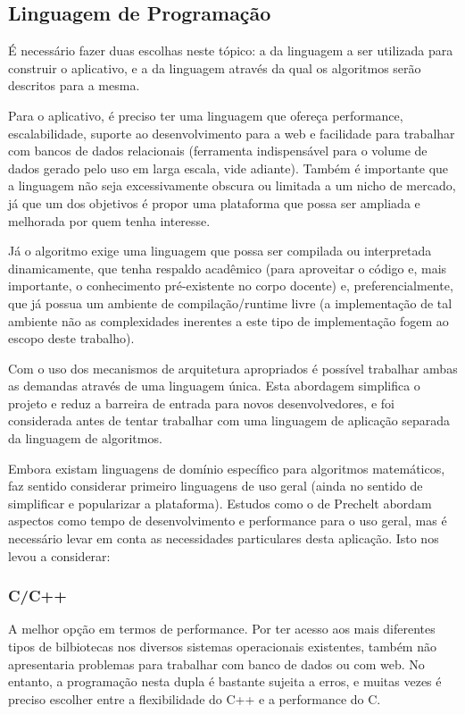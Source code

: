 \documentclass{abnt}
\begin{document}
\subsection{Linguagem de Programação}
É necessário fazer duas escolhas neste tópico: a da linguagem a ser utilizada para construir o aplicativo, e a da linguagem através da qual os algoritmos serão descritos para a mesma.

Para o aplicativo, é preciso ter uma linguagem que ofereça performance, escalabilidade, suporte ao desenvolvimento para a web e facilidade para trabalhar com bancos de dados relacionais (ferramenta indispensável para o volume de dados gerado pelo uso em larga escala, vide adiante). Também é importante que a linguagem não seja excessivamente obscura ou limitada a um nicho de mercado, já que um dos objetivos é propor uma plataforma que possa ser ampliada e melhorada por quem tenha interesse.

Já o algoritmo exige uma linguagem que possa ser compilada ou interpretada dinamicamente, que tenha respaldo acadêmico (para aproveitar o código e, mais importante, o conhecimento pré-existente no corpo docente) e, preferencialmente, que já possua um ambiente de compilação/runtime livre (a implementação de tal ambiente não as complexidades inerentes a este tipo de implementação fogem ao escopo deste trabalho). 

Com o uso dos mecanismos de arquitetura apropriados é possível trabalhar ambas as demandas através de uma linguagem única. Esta abordagem simplifica o projeto e reduz a barreira de entrada para novos desenvolvedores, e foi considerada antes de tentar trabalhar com uma linguagem de aplicação separada da linguagem de algoritmos.

Embora existam linguagens de domínio específico para algoritmos matemáticos, faz sentido considerar primeiro linguagens de uso geral (ainda no sentido de simplificar e popularizar a plataforma). Estudos como o de Prechelt\cite{Prechelt} abordam aspectos como tempo de desenvolvimento e performance para o uso geral, mas é necessário levar em conta as necessidades particulares desta aplicação. Isto nos levou a considerar:

\subsubsection{C/C++}
A melhor opção em termos de performance. Por ter acesso aos mais diferentes tipos de bilbiotecas nos diversos sistemas operacionais existentes, também não apresentaria problemas para trabalhar com banco de dados ou com web. No entanto, a programação nesta dupla é bastante sujeita a erros, e muitas vezes é preciso escolher entre a flexibilidade do C++ e a performance do C.
\end{document}
